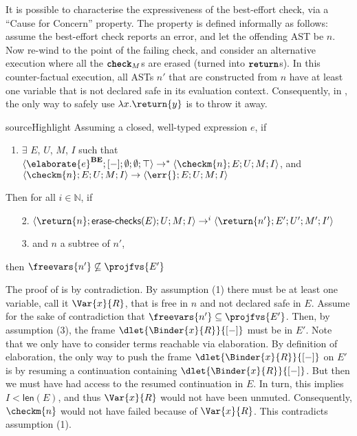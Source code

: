 It is possible to characterise the expressiveness of the best-effort check, via a ``Cause for Concern'' property. The property is defined informally as follows: assume the best-effort check reports an error, and let the offending AST be $n$. Now re-wind to the point of the failing check, and consider an alternative execution where all the $\textbf{\texttt{check}}_M$s are erased (turned into $\textbf{\texttt{return}}$s). In this counter-factual execution, all ASTs $n'$ that are constructed from $n$ have at least one variable that is not declared safe in its evaluation context. Consequently, in , the only way to safely use $\lambda x.\return{y}$ is to throw it away. 

\begin{theorem}{sourceHighlight}\label{thm:best-effort-cause-for-concern} Assuming a closed, well-typed \sourceLang{} expression $e$, if
  \begin{enumerate}
    \item $\exists$ $E$, $U$, $M$, $I$ such that $\langle \elaborate{e}^{\textbf{BE}}; [-];\emptyset; \emptyset; \top \rangle \to^{*}\langle \checkm{n}; E; U; M; I \rangle$,
    and \\$\langle \checkm{n}; E; U; M; I \rangle \to \langle \err{}; E; U; M; I \rangle$
  \end{enumerate}
Then for all $i \in \mathbb{N}$, if 
\begin{enumerate}
  \item[2.] $\langle \return{n}; \textsf{erase-checks}(E); U; M; I \rangle \to^{i} \langle \return{n'}; E'; U'; M'; I' \rangle$
  \item[3.] and $n$ a subtree of $n'$,  
\end{enumerate}
then $\freevars{n'} \not\subseteq \projfvs{E'}$  
\end{theorem}

The proof of  is by contradiction. By assumption (1) there must be at least one variable, call it $\Var{x}{R}$, that is free in $n$ and not declared safe in $E$. Assume for the sake of contradiction that $\freevars{n'} \subseteq \projfvs{E'}$. Then, by assumption (3), the frame $\dlet{\Binder{x}{R}}{[-]}$ must be in $E'$. Note that we only have to consider terms reachable via elaboration. By definition of elaboration, the only way to push the frame $\dlet{\Binder{x}{R}}{[-]}$ on $E'$ is by resuming a continuation containing $\dlet{\Binder{x}{R}}{[-]}$. But then we must have had access to the resumed continuation in $E$. In turn, this implies $I < \textsf{len}(E)$, and thus $\Var{x}{R}$ would not have been unmuted. Consequently, $\checkm{n}$ would not have failed because of $\Var{x}{R}$. This contradicts assumption (1). 

